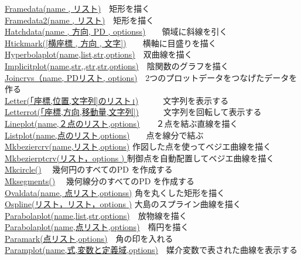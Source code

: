 \documentclass[papersize,a4paper,12pt,uplatex]{jsarticle}
\begin{document}
\begin{tabbing}
\hyperlink{framedata}{Framedata(name , リスト)}　\>矩形を描く\\
\hyperlink{framedata}{Framedata2(name , リスト)}　\>矩形を描く\\
\hyperlink{hatchdata}{Hatchdata(name , 方向, PD , optionss)}　　\>領域に斜線を引く\\
\hyperlink{htickmark}{Htickmark([横座標 , 方向 , 文字])}　　\>横軸に目盛りを描く\\
\hyperlink{hyperbolaplot}{Hyperbolaplot(name,list,str,options)}　\>双曲線を描く\\
\hyperlink{implicitplot}{Implicitplot(name,str,,str,str,options)}　\>陰関数のグラフを描く\\
\hyperlink{joincrvs}{Joincrvs（name, PDリスト, options)}　\>2つのプロットデータをつなげたデータを作る\\
\hyperlink{letter}{Letter(「座標,位置,文字列]のリスト」)}　　　\>文字列を表示する\\
\hyperlink{letterrot}{Letterrot(「座標,方向,移動量,文字列])}　　　\>文字列を回転して表示する\\
\hyperlink{lineplot}{Lineplot(name,２点のリスト,options)}　　\>２点を結ぶ直線を描く\\
\hyperlink{listplot}{Listplot(name,点のリスト,options)}　　\>点を線分で結ぶ\\
\hyperlink{mkbeziercrv}{Mkbeziercrv(name,リスト,options)}  \>作図した点を使ってベジエ曲線を描く\\
\hyperlink{mkbezierptcrv}{Mkbezierptcrv(リスト，options ) } \>制御点を自動配置してベジエ曲線を描く\\
\hyperlink{mkcircle}{Mkcircle()} 　\>幾何円のすべてのPD を作成する\\
\hyperlink{mksegments}{Mksegments()}　\> 幾何線分のすべてのPD を作成する\\
\hyperlink{ovaldata}{Ovaldata(name, 点リスト,optionss)}    \>角を丸くした矩形を描く\\
\hyperlink{ospline}{Ospline(リスト，リスト，options )}   \>大島のスプライン曲線を描く\\
\hyperlink{parabolaplot}{Parabolaplot(name,list,str,options)}　\>放物線を描く\\
\hyperlink{parabolaplot}{Parabolaplot(name,点リスト,options)}　\>楕円を描く\\
\hyperlink{paramark}{Paramark(点リスト,options)}　\>角の印を入れる\\
\hyperlink{paramplot}{Paramplot(name,式,変数と定義域,options)}　\>媒介変数で表された曲線を表示する\\

\end{tabbing}
\end{document}
